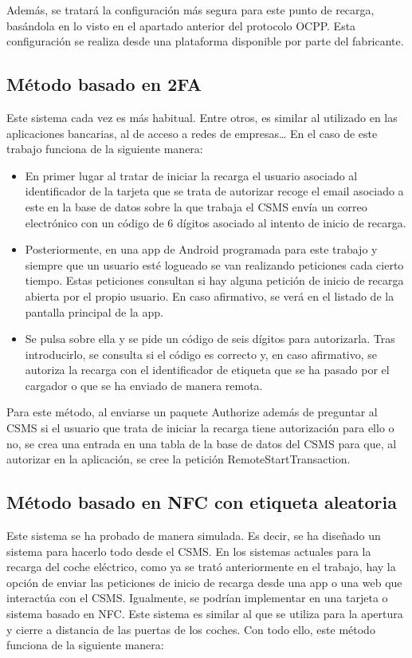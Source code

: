 \documentclass[12pt,a4paper,onecolumn,oneside]{report}
\begin{document}
Además, se tratará la configuración más segura para este punto de recarga, basándola en lo visto en el apartado anterior del protocolo OCPP. Esta configuración se realiza desde una plataforma disponible por parte del fabricante.

\subsection{Método basado en 2FA}

Este sistema cada vez es más habitual. Entre otros, es similar al utilizado en las aplicaciones bancarias, al de acceso a redes de empresas… En el caso de este trabajo funciona de la siguiente manera:

\begin{itemize}
\item En primer lugar al tratar de iniciar la recarga el usuario asociado al identificador de la tarjeta que se trata de autorizar recoge el email asociado a este en la base de datos sobre la que trabaja el CSMS envía un correo electrónico con un código de 6 dígitos asociado al intento de inicio de recarga.
\item Posteriormente, en una app de Android programada para este trabajo y siempre que un usuario esté logueado se van realizando peticiones cada cierto tiempo. Estas peticiones consultan si hay alguna petición de inicio de recarga abierta por el propio usuario. En caso afirmativo, se verá en el listado de la pantalla principal de la app. 
\item Se pulsa sobre ella y se pide un código de seis dígitos para autorizarla. Tras introducirlo, se consulta si el código es correcto y, en caso afirmativo, se autoriza la recarga con el identificador de etiqueta que se ha pasado por el cargador o que se ha enviado de manera remota.
\end{itemize}

Para este método, al enviarse un paquete Authorize además de preguntar al CSMS si el usuario que trata de iniciar la recarga tiene autorización para ello o no, se crea una entrada en una tabla de la base de datos del CSMS para que, al autorizar en la aplicación, se cree la petición RemoteStartTransaction.


\subsection{Método basado en NFC con etiqueta aleatoria}

Este sistema se ha probado de manera simulada. Es decir, se ha diseñado un sistema para hacerlo todo desde el CSMS. En los sistemas actuales para la recarga del coche eléctrico, como ya se trató anteriormente en el trabajo, hay la opción de enviar las peticiones de inicio de recarga desde una app o una web que interactúa con el CSMS. Igualmente, se podrían implementar en una tarjeta o sistema basado en NFC. Este sistema es similar al que se utiliza para la apertura y cierre a distancia de las puertas de los coches. Con todo ello, este método funciona de la siguiente manera:
\end{document}

